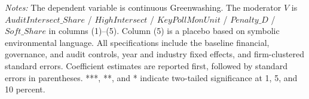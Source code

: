 \begin{table}[htbp]
    \centering
    \caption{Scope Conditions Consistent with an Other-Information Channel}
    \label{tab:scope-conditions}
    \par\smallskip
    \begin{minipage}{0.98\textwidth}
        \footnotesize
        \textit{Notes:} The dependent variable is continuous Greenwashing. The moderator \(V\) is \(AuditIntersect\_Share\) / \(HighIntersect\) / \(KeyPollMonUnit\) / \(Penalty\_D\) / \(Soft\_Share\) in columns (1)--(5). Column (5) is a placebo based on symbolic environmental language. All specifications include the baseline financial, governance, and audit controls, year and industry fixed effects, and firm-clustered standard errors. Coefficient estimates are reported first, followed by standard errors in parentheses. ***, **, and * indicate two-tailed significance at 1, 5, and 10 percent.
    \end{minipage}
\end{table}